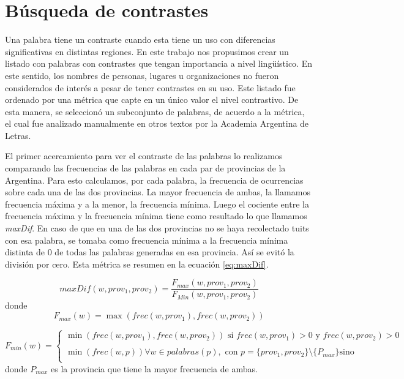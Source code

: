 

\section{Búsqueda de contrastes}

Una palabra tiene un contraste cuando esta tiene un uso con diferencias significativas en
distintas regiones. En este trabajo nos propusimos crear un listado con palabras con contrastes que tengan
importancia a nivel lingüístico. En este sentido, los nombres de personas, lugares u organizaciones no 
fueron considerados de interés a pesar de tener contrastes en su uso.
Este listado fue ordenado por una métrica que capte en un único valor el nivel contrastivo. De esta manera, 
se seleccionó un subconjunto de palabras, de acuerdo a la métrica, el cual fue analizado manualmente en otros textos por la Academia Argentina de Letras.

El primer acercamiento para ver el contraste de las palabras lo realizamos comparando las frecuencias de las palabras 
en cada par de provincias de la Argentina. Para esto calculamos, por cada palabra, la frecuencia de ocurrencias sobre cada una de las dos provincias. La mayor frecuencia de ambas, la llamamos frecuencia máxima y a la menor, la frecuencia mínima. Luego el cociente entre la frecuencia máxima y la frecuencia mínima tiene como resultado lo que llamamos \textit{maxDif}. En caso de que en una de las dos provincias no se haya 
recolectado tuits con esa palabra, se tomaba como frecuencia mínima a la frecuencia mínima distinta de 0 de todas las palabras generadas en esa provincia. Así se evitó la división por cero. Esta métrica se resumen en la ecuación \ref{eq:maxDif}.


\begin{equation}
  \label{eq:maxDif} 
  maxDif(w,prov_1,prov_2) = \frac{F_{max}(w,prov_1,prov_2)}{F_{Min}(w,prov_1,prov_2)}
\end{equation}
donde 
\begin{equation}
F_{max}(w) = \max(frec(w,prov_1),frec(w,prov_2))
\end{equation}

\begin{equation}
 F_{min}(w) = \left\{ \begin{array}{ll}
             \min(frec(w,prov_1),frec(w,prov_2))  \text{ si } frec(w,prov_1) > 0 \text{ y } frec(w,prov_2) > 0 & \\
             \\\min(frec(w,p)) \forall w \in palabras(p) , \text{ con } p=\{prov_1,prov_2\} \setminus \{P_{max}\} \text{sino} &  \\
             \end{array}
   \right.
\end{equation}
   donde $P_{max}$ es la provincia que tiene la mayor frecuencia de ambas.\\



